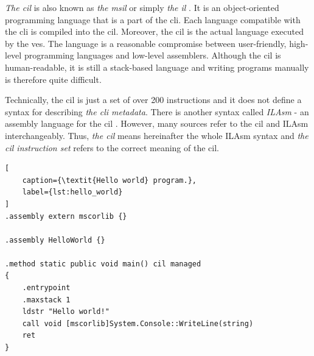 \documentclass{article}
\numberwithin{equation}{section}
\begin{document}
\textit{The \acrfull{cil}} is also known as \textit{the \acrfull{msil}} or simply \textit{the \acrfull{il}} \cite{procsharp7}. It is an object-oriented programming language that is a part of the \acrshort{cli}. Each language compatible with the \acrshort{cli} is compiled into the \acrshort{cil}. Moreover, the \acrshort{cil} is the actual language executed by the \acrshort{ves}. The language is a reasonable compromise between user-friendly, high-level programming languages and low-level assemblers. Although the \acrshort{cil} is human-readable, it is still a stack-based language and writing programs manually is therefore quite difficult.

Technically, the \acrshort{cil} is just a set of over 200 instructions and it does not define a syntax for describing \textit{the \acrshort{cli} metadata}. There is another syntax called \textit{ILAsm} - an assembly language for the \acrshort{cil} \cite{ecmaStandard}. However, many sources refer to the \acrshort{cil} and ILAsm interchangeably. Thus, \textit{the \acrshort{cil}} means hereinafter the whole ILAsm syntax and \textit{the \acrshort{cil} instruction set} refers to the correct meaning of the \acrlong{cil}.

\begin{lstlisting}[
	caption={\textit{Hello world} program.},
	label={lst:hello_world}
]
.assembly extern mscorlib {}

.assembly HelloWorld {}

.method static public void main() cil managed
{
	.entrypoint
	.maxstack 1
	ldstr "Hello world!"
	call void [mscorlib]System.Console::WriteLine(string)
	ret
}
\end{lstlisting}
\end{document}
